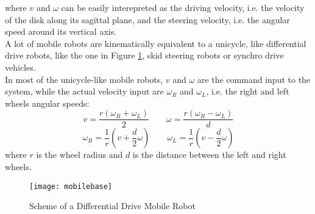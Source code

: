 where $v$ and $\omega$ can be easily interepreted as the driving velocity, i.e. the velocity of the disk along its sagittal plane, and the steering velocity, i.e. the angular speed around its vertical axis.\\
A lot of mobile robots are kinematically equivalent to a unicycle, like differential drive robots, like the one in Figure \ref{fig:mobilebase}, skid steering robots or synchro drive vehicles.\\
In most of the unicycle-like mobile robots, $v$ and $\omega$ are the command input to the system, while the actual velocity input are $\omega_R$ and $\omega_L$, i.e. the right and left wheels angular speeds: 
\begin{equation}
v=\frac{r\left(\omega_R + \omega_L\right)}{2} \qquad \omega=\frac{r\left(\omega_R - \omega_L\right)}{d}
\end{equation}
\begin{equation}
\omega_R =\frac{1}{r}\left(v+\frac{d}{2}\omega\right) \qquad \omega_L=\frac{1}{r}\left(v-\frac{d}{2}\omega\right)
\end{equation}
where $r$ is the wheel radius and $d$ is the distance between the left and right wheels.
\begin{figure}[h!]
	\centering
	\texttt{[image: mobilebase]}
	\caption{Scheme of a Differential Drive Mobile Robot}
	\label{fig:mobilebase}
\end{figure}

